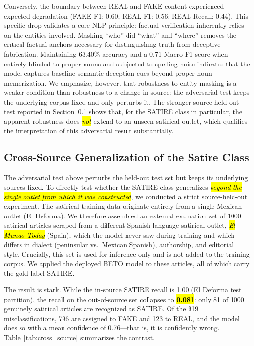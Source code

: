 \documentclass[informatics,article,accept,pdftex,moreauthors]{Definitions/mdpi}
\begin{document}
Conversely, the boundary between REAL and FAKE content experienced expected degradation (FAKE F1: 0.60; REAL F1: 0.56; REAL Recall: 0.44). This specific drop validates a core NLP principle: factual verification inherently relies on the entities involved. Masking ``who'' did ``what'' and ``where'' removes the critical factual anchors necessary for distinguishing truth from deceptive fabrication. Maintaining 63.40\% accuracy and a 0.71 Macro F1-score when entirely blinded to proper nouns and subjected to spelling noise indicates that the model captures baseline semantic deception cues beyond proper-noun memorization. We emphasize, however, that robustness to entity masking is a weaker condition than robustness to a change in source: the adversarial test keeps the underlying corpus fixed and only perturbs it. The stronger source-held-out test reported in Section~\ref{sec:cross-source} shows that, for the SATIRE class in particular, the apparent robustness does \emph{\hl{not}} extend to an unseen satirical outlet, which qualifies the interpretation of this adversarial result substantially.

\subsection{Cross-Source Generalization of the Satire Class}\label{sec:cross-source}
The adversarial test above perturbs the held-out test set but keeps its underlying sources fixed. To directly test whether the SATIRE class generalizes \emph{\hl{beyond the single outlet from which it was constructed}}, we conducted a strict source-held-out experiment. The satirical training data originate entirely from a single Mexican outlet (El Deforma). We therefore assembled an external evaluation set of 1000 satirical articles scraped from a different Spanish-language satirical outlet, \textit{\hl{El Mundo Today}} (Spain), which the model never saw during training and which differs in dialect (peninsular vs.\ Mexican Spanish), authorship, and editorial style. Crucially, this set is used for inference only and is not added to the training corpus. We applied the deployed BETO model to these articles, all of which carry the gold label SATIRE.

The result is stark. While the in-source SATIRE recall is 1.00 (El Deforma test partition), the recall on the out-of-source set collapses to \textbf{\hl{0.081}}: only 81 of 1000 genuinely satirical articles are recognized as SATIRE. Of the 919 misclassifications, 796 are assigned to FAKE and 123 to REAL, and the model does so with a mean confidence of 0.76—that is, it is confidently wrong. Table~\ref{tab:cross_source} summarizes the contrast.
\end{document}
